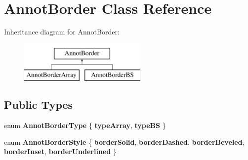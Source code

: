 \hypertarget{class_annot_border}{}\section{Annot\+Border Class Reference}
\label{class_annot_border}
Inheritance diagram for Annot\+Border\+:\begin{figure}[H]
\begin{center}
\leavevmode
\includegraphics[height=2.000000cm]{class_annot_border}
\end{center}
\end{figure}
\subsection*{Public Types}
\begin{DoxyCompactItemize}
\item 
\mbox{\label{class_annot_border_adf9dca199bac4f6b1f6ea67ed9f5b4db}} 
enum {\bfseries Annot\+Border\+Type} \{ {\bfseries type\+Array}, 
{\bfseries type\+BS}
 \}
\item 
\mbox{\label{class_annot_border_aacac14d9d1d927eff992ce6a119b5fc7}} 
enum {\bfseries Annot\+Border\+Style} \{ \newline
{\bfseries border\+Solid}, 
{\bfseries border\+Dashed}, 
{\bfseries border\+Beveled}, 
{\bfseries border\+Inset}, 
\newline
{\bfseries border\+Underlined}
 \}
\end{DoxyCompactItemize}
